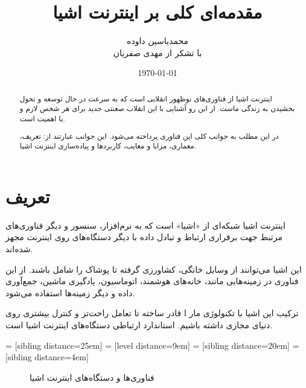 \documentclass[a4paper]{article}
\author{محمدیاسین داوده\\
  \small{با تشکر از مهدی صفریان}}
\title{مقدمه‌ای کلی بر اینترنت اشیا}
\date{\today}
\begin{document}
\begin{titlingpage}
\maketitle

\begin{abstract}
  اینترنت اشیا از فناوری‌های نوظهور انقلابی است که به سرعت در حال توسعه و تحول بخشیدن به زندگی ماست.
  از این رو آشنایی با این انقلاب صعنتی جدید برای هر شخص لازم و با اهمیت است.

  در این مطلب به جوانب کلی این فناوری پرداخته می‌شود. این جوانب عبارتند از: تعریف، معماری، مزایا و معایب، کاربردها و پیاده‌سازی اینترنت اشیا.
\end{abstract}

\tableofcontents
\end{titlingpage}

\section{تعریف}
اینترنت اشیا شبکه‌ای از «اشیا» است که به نرم‌افزار، سنسور و دیگر فناوری‌های
مرتبط جهت برقراری ارتباط و تبادل داده با دیگر دستگاه‌های روی اینترنت مجهز شده‌اند.

این اشیا می‌توانند از وسایل خانگی، کشاورزی گرفته تا پوشاک را شامل باشند. از این فناوری در زمینه‌هایی مانند، خانه‌های هوشمند، اتوماسیون، یادگیری ماشین، جمع‌آوری داده و دیگر زمینه‌ها استفاده می‌شود.\cite{wp:iot}

ترکیب این اشیا با تکنولوژی مار ا قادر ساخته تا تعامل راحت‌تر و کنترل بیشتری روی دنیای مجازی داشته باشیم.
استاندارد ارتباطی دستگاه‌های اینترنت اشیا  است.\cite{javat}

 = [sibling distance=25em]
 = [level distance=9em]
 = [sibling distance=20em]
 = [sibling distance=4em]
\begin{figure}[ht]\centering
{}
\caption{فناوری‌ها و دستگاه‌های اینترنت اشیا}
\end{figure}
\end{document}

